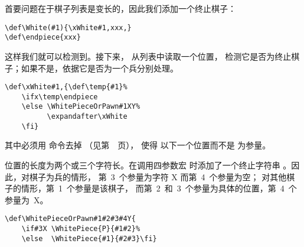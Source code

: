 \documentclass[letterpaper]{book}
\begin{document}
首要问题在于棋子列表是变长的，因此我们添加一个终止棋子：
\begin{verbatim}
\def\White(#1){\xWhite#1,xxx,}
\def\endpiece{xxx}
\end{verbatim}
这样我们就可以检测到。接下来， 从列表中读取一个位置，
检测它是否为终止棋子；如果不是，依据它是否为一个兵分别处理。
\begin{verbatim}
\def\xWhite#1,{\def\temp{#1}%
    \ifx\temp\endpiece 
    \else \WhitePieceOrPawn#1XY%
          \expandafter\xWhite 
    \fi}
\end{verbatim}
其中必须用  命令去掉 （见第~\pageref{after:cond}~页），
使得  以下一个位置而不是  为参量。

位置的长度为两个或三个字符长。在调用四参数宏 
时添加了一个终止字符串 。因此，对棋子为兵的情形，
第~3~个参量为字符 \n X 而第~4~个参量为空；
对其他棋子的情形，第~1~个参量是该棋子，
而第~2~和~3~个参量为具体的位置，第~4~个参量为~\n X。
\begin{verbatim}
\def\WhitePieceOrPawn#1#2#3#4Y{
    \if#3X \WhitePiece{P}{#1#2}%
    \else  \WhitePiece{#1}{#2#3}\fi}
\end{verbatim}
\end{document}
